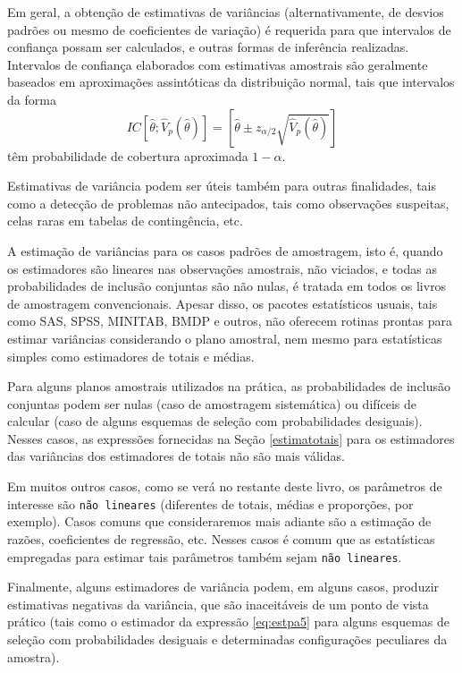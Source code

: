\documentclass[]{book}
\theoremstyle{definition}
\theoremstyle{definition}
\theoremstyle{definition}
\theoremstyle{remark}
\begin{document}
Em geral, a obtenção de estimativas de variâncias (alternativamente, de
desvios padrões ou mesmo de coeficientes de variação) é requerida para
que intervalos de confiança possam ser calculados, e outras formas de
inferência realizadas. Intervalos de confiança elaborados com
estimativas amostrais são geralmente baseados em aproximações
assintóticas da distribuição normal, tais que intervalos da forma \[
IC\left[ \widehat{\theta };\widehat{V}_{p}\left( \widehat{\theta }\right)
\right] =\left[ \widehat{\theta }\pm z_{\alpha /2}\sqrt{\widehat{V}%
_{p}\left( \widehat{\theta }\right) }\right] 
\] têm probabilidade de cobertura aproximada \(1-\alpha\).

Estimativas de variância podem ser úteis também para outras finalidades,
tais como a detecção de problemas não antecipados, tais como observações
suspeitas, celas raras em tabelas de contingência, etc.

A estimação de variâncias para os casos padrões de amostragem, isto é,
quando os estimadores são lineares nas observações amostrais, não
viciados, e todas as probabilidades de inclusão conjuntas são não nulas,
é tratada em todos os livros de amostragem convencionais. Apesar disso,
os pacotes estatísticos usuais, tais como SAS, SPSS, MINITAB, BMDP e
outros, não oferecem rotinas prontas para estimar variâncias
considerando o plano amostral, nem mesmo para estatísticas simples como
estimadores de totais e médias.

Para alguns planos amostrais utilizados na prática, as probabilidades de
inclusão conjuntas podem ser nulas (caso de amostragem sistemática) ou
difíceis de calcular (caso de alguns esquemas de seleção com
probabilidades desiguais). Nesses casos, as expressões fornecidas na
Seção \ref{estimatotais} para os estimadores das variâncias dos
estimadores de totais não são mais válidas.

Em muitos outros casos, como se verá no restante deste livro, os
parâmetros de interesse são \texttt{não\ lineares} (diferentes de
totais, médias e proporções, por exemplo). Casos comuns que
consideraremos mais adiante são a estimação de razões, coeficientes de
regressão, etc. Nesses casos é comum que as estatísticas empregadas para
estimar tais parâmetros também sejam \texttt{não\ lineares}.

Finalmente, alguns estimadores de variância podem, em alguns casos,
produzir estimativas negativas da variância, que são inaceitáveis de um
ponto de vista prático (tais como o estimador da expressão
\eqref{eq:estpa5} para alguns esquemas de seleção com probabilidades
desiguais e determinadas configurações peculiares da amostra).
\end{document}
